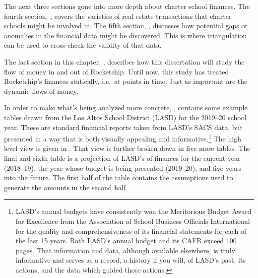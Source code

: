 
The next three sections gone into more depth about charter school finances. The fourth section, , covers the varieties of real estate transactions that charter schools might be involved in. The fifth section, , discusses how potential gaps or anomalies in the financial data might be discovered. This is where triangulation can be used to cross-check the validity of that data. %

The last section in this chapter, , describes how this dissertation will study the flow of money in and out of Rocketship. Until now, this study has treated Rocketship's finances statically, i.e.~at points in time. Just as important are the dynamic flows of money. %

In order to make what's being analyzed more concrete, , contains some example tables drawn from the Los Altos School District (LASD) for the 2019–20 school year. These are standard financial reports taken from LASD's SACS data, but presented in a way that is both visually appealing and informative.\footnote{LASD's annual budgets have consistently won the Meritorious Budget Award for Excellence from the Association of School Business Officials International for the quality and comprehensiveness of its financial statements for each of the last 15 years. Both LASD's annual budget and its CAFR exceed 100 pages. That information and data, although available elsewhere, is truly informative and serves as a record, a history if you will, of LASD's past, its actions, and the data which guided those actions.} The high level view is given in . That view is further broken down in five more tables. The final and sixth table is a projection of LASD's of finances for the current year (2018–19), the year whose budget is being presented (2019–20), and five years into the future. The first half of the table contains the assumptions used to generate the amounts in the second half.

